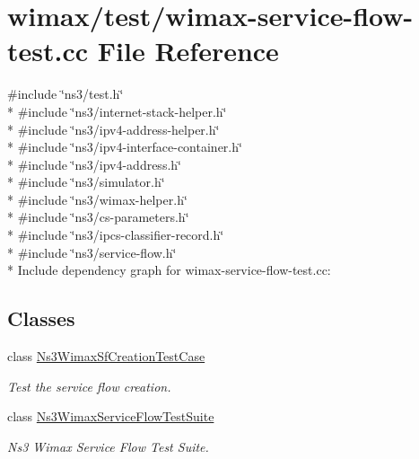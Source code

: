 \hypertarget{wimax-service-flow-test_8cc}{}\section{wimax/test/wimax-\/service-\/flow-\/test.cc File Reference}
\label{wimax-service-flow-test_8cc}
{\ttfamily \#include \char`\"{}ns3/test.\+h\char`\"{}}\\*
{\ttfamily \#include \char`\"{}ns3/internet-\/stack-\/helper.\+h\char`\"{}}\\*
{\ttfamily \#include \char`\"{}ns3/ipv4-\/address-\/helper.\+h\char`\"{}}\\*
{\ttfamily \#include \char`\"{}ns3/ipv4-\/interface-\/container.\+h\char`\"{}}\\*
{\ttfamily \#include \char`\"{}ns3/ipv4-\/address.\+h\char`\"{}}\\*
{\ttfamily \#include \char`\"{}ns3/simulator.\+h\char`\"{}}\\*
{\ttfamily \#include \char`\"{}ns3/wimax-\/helper.\+h\char`\"{}}\\*
{\ttfamily \#include \char`\"{}ns3/cs-\/parameters.\+h\char`\"{}}\\*
{\ttfamily \#include \char`\"{}ns3/ipcs-\/classifier-\/record.\+h\char`\"{}}\\*
{\ttfamily \#include \char`\"{}ns3/service-\/flow.\+h\char`\"{}}\\*
Include dependency graph for wimax-\/service-\/flow-\/test.cc\+:
\subsection*{Classes}
\begin{DoxyCompactItemize}
\item 
class \hyperlink{classNs3WimaxSfCreationTestCase}{Ns3\+Wimax\+Sf\+Creation\+Test\+Case}
\begin{DoxyCompactList}\small\item\em Test the service flow creation. \end{DoxyCompactList}\item 
class \hyperlink{classNs3WimaxServiceFlowTestSuite}{Ns3\+Wimax\+Service\+Flow\+Test\+Suite}
\begin{DoxyCompactList}\small\item\em Ns3 Wimax Service Flow Test Suite. \end{DoxyCompactList}\end{DoxyCompactItemize}

